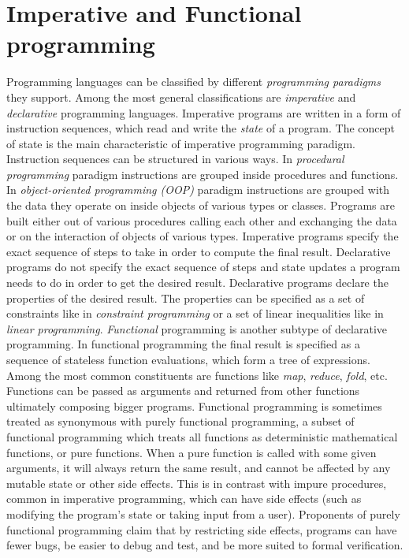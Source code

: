 \section{Imperative and Functional programming}
\label{background_programming_paradigms}
\quad Programming languages can be classified by different \textit{programming paradigms} they support. Among the most general classifications are \textit{imperative} and \textit{declarative} programming languages.\newline\null
\quad Imperative programs are written in a form of instruction sequences, which read and write the \textit{state} of a program. The concept of state is the main characteristic of imperative programming paradigm. Instruction sequences can be structured in various ways. In \textit{procedural programming} paradigm instructions are grouped inside procedures and functions. In \textit{object-oriented programming (OOP)} paradigm instructions are grouped with the data they operate on inside objects of various types or classes. Programs are built either out of various procedures calling each other and exchanging the data or on the interaction of objects of various types. Imperative programs specify the exact sequence of steps to take in order to compute the final result.\newline\null
\quad Declarative programs do not specify the exact sequence of steps and state updates a program needs to do in order to get the desired result. Declarative programs declare the properties of the desired result. The properties can be specified as a set of constraints like in \textit{constraint programming} or a set of linear inequalities like in \textit{linear programming}. \textit{Functional} programming is another subtype of declarative programming. In functional programming the final result is specified as a sequence of stateless function evaluations, which form a tree of expressions. Among the most common constituents are functions like \textit{map}, \textit{reduce}, \textit{fold}, etc. Functions can be passed as arguments and returned from other functions ultimately composing bigger programs.\newline\null
\quad Functional programming is sometimes treated as synonymous with purely functional programming, a subset of functional programming which treats all functions as deterministic mathematical functions, or pure functions. When a pure function is called with some given arguments, it will always return the same result, and cannot be affected by any mutable state or other side effects. This is in contrast with impure procedures, common in imperative programming, which can have side effects (such as modifying the program's state or taking input from a user). Proponents of purely functional programming claim that by restricting side effects, programs can have fewer bugs, be easier to debug and test, and be more suited to formal verification.\newline\null
